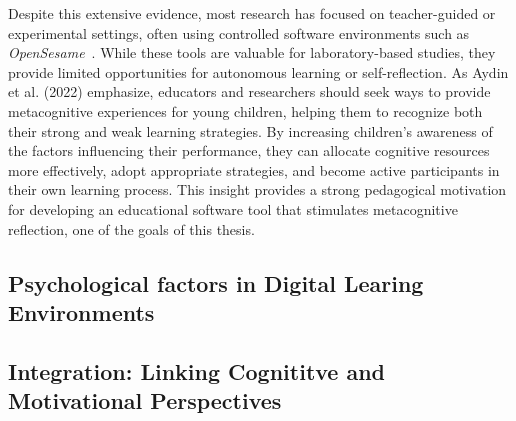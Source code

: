 Despite this extensive evidence, most research has focused on teacher-guided or experimental settings, often using controlled software environments such as \textit{OpenSesame}~\cite{mathot_opensesame_2012}.
While these tools are valuable for laboratory-based studies, they provide limited opportunities for autonomous learning or self-reflection.
As Aydin et al. (2022) \cite{aydin_i_2022_new} emphasize, educators and researchers should seek ways to provide metacognitive experiences for young children, helping them to recognize both their strong and weak learning strategies. 
By increasing children's awareness of the factors influencing their performance, they can allocate cognitive resources more effectively, adopt appropriate strategies, and become active participants in their own learning process. 
This insight provides a strong pedagogical motivation for developing an educational software tool that stimulates metacognitive reflection, one of the goals of this thesis.




\subsection{Psychological factors in Digital Learing Environments}
\subsection{Integration: Linking Cognititve and Motivational Perspectives}
